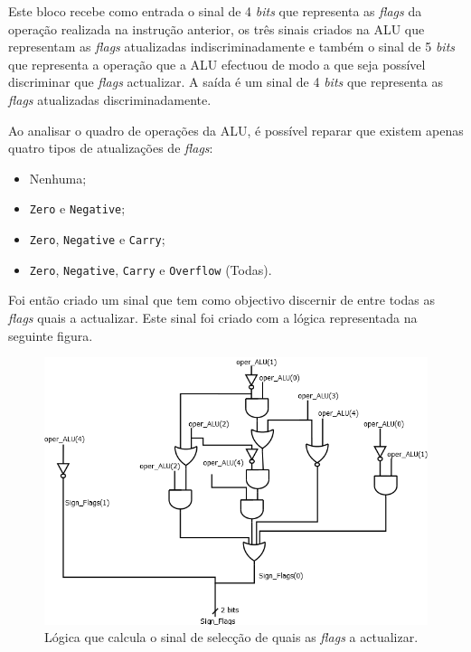 \documentclass[11pt]{article}
\numberwithin{equation}{section}
\begin{document}
Este bloco recebe como entrada o sinal de 4 \textit{bits} que representa as \textit{flags} da operação realizada na instrução anterior, os três sinais criados na ALU que representam as \textit{flags} atualizadas indiscriminadamente e também o sinal de 5 \textit{bits} que representa a operação que a ALU efectuou de modo a que seja possível discriminar que \textit{flags} actualizar. A saída é um sinal de 4 \textit{bits} que representa as \textit{flags} atualizadas discriminadamente.

Ao analisar o quadro de operações da ALU, é possível reparar que existem apenas quatro tipos de atualizações de \textit{flags}:

\vspace{-2mm}

\begin{itemize}
  \item Nenhuma;
  \vspace{-2.5mm}
  \item \texttt{Zero} e \texttt{Negative};
  \vspace{-2.5mm}
  \item \texttt{Zero}, \texttt{Negative} e \texttt{Carry};
  \vspace{-2.5mm}
  \item \texttt{Zero}, \texttt{Negative}, \texttt{Carry} e \texttt{Overflow} (Todas).
\end{itemize}

Foi então criado um sinal que tem como objectivo discernir de entre todas as \textit{flags} quais a actualizar. Este sinal foi criado com a lógica representada na seguinte figura.

\begin{figure}[H]
	\centering
	\includegraphics[keepaspectratio=true, scale=0.5]{imagens/Sign_Flags}
	\caption{Lógica que calcula o sinal de selecção de quais as \textit{flags} a actualizar.}
	\vspace{-0.8em}
\end{figure}
\end{document}
